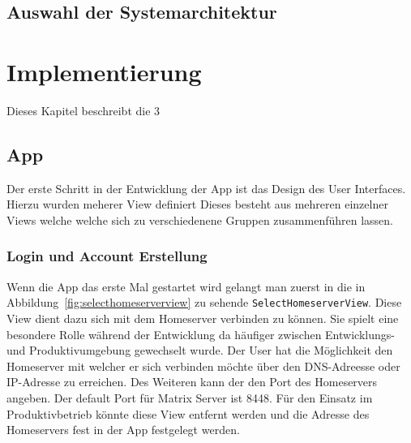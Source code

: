     \section{Auswahl der Systemarchitektur}\label{sec:auswahl-der-systemarchitektur}

    \newpage
    \chapter{Implementierung}\label{ch:implementierung}
    Dieses Kapitel beschreibt die 3



    \section{App}
    Der erste Schritt in der Entwicklung der App ist das Design des User Interfaces.
    Hierzu wurden meherer View definiert
    Dieses besteht aus mehreren einzelner Views welche welche sich zu verschiedenene Gruppen zusammenführen lassen.

    \newpage
    \subsection{Login und Account Erstellung}

    Wenn die App das erste Mal gestartet wird gelangt man zuerst in die in Abbildung~\ref{fig:selecthomeserverview} zu sehende \texttt{SelectHomeserverView}.
    Diese View dient dazu sich mit dem Homeserver verbinden zu können.
    Sie spielt eine besondere Rolle während der Entwicklung da häufiger zwischen Entwicklungs- und Produktivumgebung gewechselt wurde.
    Der User hat die Möglichkeit den Homeserver mit welcher er sich verbinden möchte über den DNS-Adreesse oder IP-Adresse zu erreichen.
    Des Weiteren kann der den Port des Homeservers angeben.
    Der default Port für Matrix Server ist 8448.
    Für den Einsatz im Produktivbetrieb könnte diese View entfernt werden und die Adresse des Homeservers fest in der App festgelegt werden.

